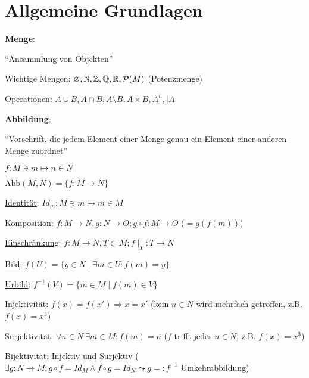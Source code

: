 \section{\label{sec:Grundlagen}Allgemeine Grundlagen}
  \textbf{Menge}:
  \begin{items}
    \item ``Ansammlung von Objekten''
    \item Wichtige Mengen: $\varnothing, \mathbb{N}, \mathbb{Z}, \mathbb{Q}, \mathbb{R}, \mathcal{P}(M)$ (Potenzmenge)
    \item Operationen: $A\cup B, A\cap B, A\setminus B, A\times B, A^n, |A|$
  \end{items}

  \textbf{Abbildung}:
  \begin{items}
    \item ``Vorschrift, die jedem Element einer Menge genau ein Element einer anderen Menge zuordnet''
    \item $f:  M\ni m \mapsto n \in N$
    \item $\text{Abb}(M,N) = \{ f:M\rightarrow N \}$
    \item \underline{Identität}: $Id_m: M \ni m \mapsto m \in M$
    \item \underline{Komposition}: $f:M\rightarrow N, g:N\rightarrow O; g\circ f: M\rightarrow O$ ($=g(f(m))$)
    \item \underline{Einschränkung}: $f:M\rightarrow N, T\subset M; f\mid_T:T\rightarrow N$
    \item \underline{Bild}: $f(U)=\{ y \in N \mid \exists m \in U: f(m)=y \}$
    \item \underline{Urbild}: $f^{-1}(V)= \{ m \in M \mid f(m) \in V \}$
    \item \underline{Injektivität}: $f(x)=f(x') \Rightarrow x=x'$ (kein $n \in N$ wird mehrfach getroffen, z.B. $f(x)=x^3$)
    \item \underline{Surjektivität}: $\forall n \in N \ \exists m \in M: f(m)=n$ ($f$ trifft jedes $n \in N$, z.B. $f(x)=x^3$)
    \item \underline{Bijektivität}: Injektiv und Surjektiv ($\exists g:N \rightarrow M: g \circ f = Id_M \wedge f \circ g = Id_N \leadsto g=:f^{-1}$ Umkehrabbildung)
  \end{items}

